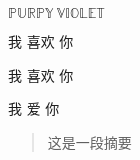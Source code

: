 \documentclass{ctexart}
\newcommand\ME{$\mathbb{PURPY} \ \mathbb{VIOLET}$}
\newcommand\likes[2]{#1 喜欢 #2} %
\newcommand\love[3][喜欢]{#2 #1 #3}
\begin{document}
    \ME


    \likes{我}{你}

    \love{我}{你} %

    \love[爱]{我}{你} %

    \begin{abstract}
        这是一段摘要
    \end{abstract}
\end{document}
